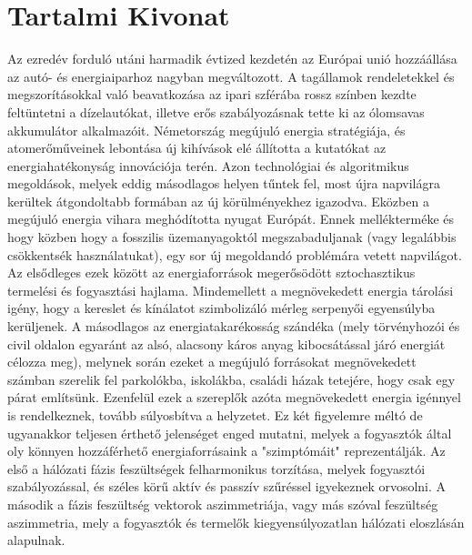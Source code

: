 %


\chapter*{Tartalmi Kivonat}
\thispagestyle{plain}
Az ezredév forduló utáni harmadik évtized kezdetén az Európai unió hozzáállása az autó- és energiaiparhoz nagyban megváltozott. A tagállamok rendeletekkel és megszorításokkal való beavatkozása az ipari szférába rossz színben kezdte feltüntetni a dízelautókat, illetve erős szabályozásnak tette ki az ólomsavas akkumulátor alkalmazóit. Németország megújuló energia stratégiája, és atomerőműveinek lebontása új kihívások elé állította a kutatókat az energiahatékonyság innovációja terén. Azon technológiai és algoritmikus megoldások, melyek eddig másodlagos helyen tűntek fel, most újra napvilágra kerültek átgondoltabb formában az új körülményekhez igazodva. Eközben a megújuló energia vihara meghódította nyugat Európát. Ennek mellékterméke és hogy közben hogy a fosszilis üzemanyagoktól megszabaduljanak (vagy legalábbis csökkentsék használatukat), egy sor új megoldandó problémára vetett napvilágot. Az elsődleges ezek között az energiaforrások megerősödött sztochasztikus termelési és fogyasztási hajlama. Mindemellett a megnövekedett energia tárolási igény, hogy a kereslet és kínálatot szimbolizáló mérleg serpenyői egyensúlyba kerüljenek. A másodlagos az energiatakarékosság szándéka (mely törvényhozói és civil oldalon egyaránt az alsó, alacsony káros anyag kibocsátással járó energiát célozza meg), melynek során ezeket a megújuló forrásokat megnövekedett számban szerelik fel parkolókba, iskolákba, családi házak tetejére, hogy csak egy párat említsünk. Ezenfelül ezek a szereplők azóta megnövekedett energia igénnyel is rendelkeznek, tovább súlyosbítva a helyzetet. Ez két figyelemre méltó de ugyanakkor teljesen érthető jelenséget enged mutatni, melyek a fogyasztók által oly könnyen hozzáférhető energiaforrásaink a "szimptómáit" reprezentálják. Az első a hálózati fázis feszültségek felharmonikus torzítása, melyek fogyasztói szabályozással, és széles körű aktív és passzív szűréssel igyekeznek orvosolni. A második a fázis feszültség vektorok aszimmetriája, vagy más szóval feszültség aszimmetria, mely a fogyasztók és termelők kiegyensúlyozatlan hálózati eloszlásán alapulnak.\\
